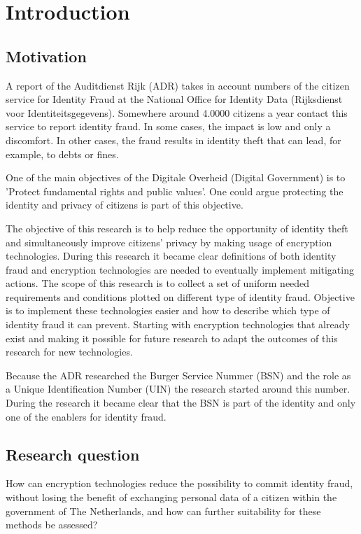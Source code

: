 \chapter{Introduction}\label{s:intro}


\section{Motivation}
A report of the Auditdienst Rijk (ADR)\cite{ADR} takes in account numbers of the citizen service for Identity Fraud at the National Office for Identity Data (Rijksdienst voor Identiteitsgegevens). Somewhere around 4.0000 citizens a year contact this service to report identity fraud. In some cases, the impact is low and only a discomfort. In other cases, the fraud results in identity theft that can lead, for example, to debts or fines.\par 
One of the main objectives of the Digitale Overheid (Digital Government) is to 'Protect fundamental rights and public values'\cite{DO_agenda}. One could argue protecting the identity and privacy of citizens is part of this objective.

The objective of this research is to help reduce the opportunity of identity theft and simultaneously improve citizens’ privacy by making usage of encryption technologies. During this research it became clear definitions of both identity fraud and encryption technologies are needed to eventually implement mitigating actions. The scope of this research is to collect a set of uniform needed requirements and conditions plotted on different type of identity fraud. Objective is to implement these technologies easier and how to describe which type of identity fraud it can prevent. Starting with encryption technologies that already exist and making it possible for future research to adapt the outcomes of this research for new technologies.

Because the ADR researched the Burger Service Nummer (BSN) and the role as a Unique Identification Number (UIN) the research started around this number. During the research it became clear that the BSN is part of the identity and only one of the enablers for identity fraud.\par

\section{Research question}
How can encryption technologies reduce the possibility to commit identity fraud, without losing the benefit of exchanging personal data of a citizen within the government of The Netherlands, and how can further suitability for these methods be assessed?

